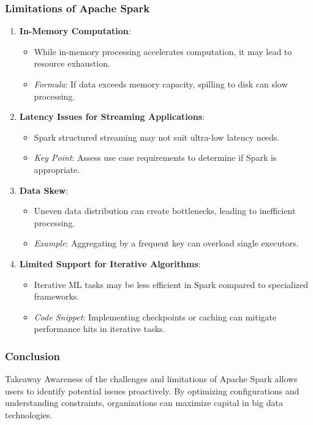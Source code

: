 \documentclass[aspectratio=169]{beamer}
\begin{document}
\begin{frame}[fragile]
    \frametitle{Limitations of Apache Spark}
    \begin{enumerate}
        \item \textbf{In-Memory Computation}:
            \begin{itemize}
                \item While in-memory processing accelerates computation, it may lead to resource exhaustion.
                \item \textit{Formula}: If data exceeds memory capacity, spilling to disk can slow processing.
            \end{itemize}

        \item \textbf{Latency Issues for Streaming Applications}:
            \begin{itemize}
                \item Spark structured streaming may not suit ultra-low latency needs.
                \item \textit{Key Point}: Assess use case requirements to determine if Spark is appropriate.
            \end{itemize}

        \item \textbf{Data Skew}:
            \begin{itemize}
                \item Uneven data distribution can create bottlenecks, leading to inefficient processing.
                \item \textit{Example}: Aggregating by a frequent key can overload single executors.
            \end{itemize}

        \item \textbf{Limited Support for Iterative Algorithms}:
            \begin{itemize}
                \item Iterative ML tasks may be less efficient in Spark compared to specialized frameworks.
                \item \textit{Code Snippet}: Implementing checkpoints or caching can mitigate performance hits in iterative tasks.
            \end{itemize}
    \end{enumerate}
\end{frame}

\begin{frame}[fragile]
    \frametitle{Conclusion}
    \begin{block}{Takeaway}
        Awareness of the challenges and limitations of Apache Spark allows users to identify potential issues proactively. By optimizing configurations and understanding constraints, organizations can maximize capital in big data technologies.
    \end{block}
\end{frame}
\end{document}
